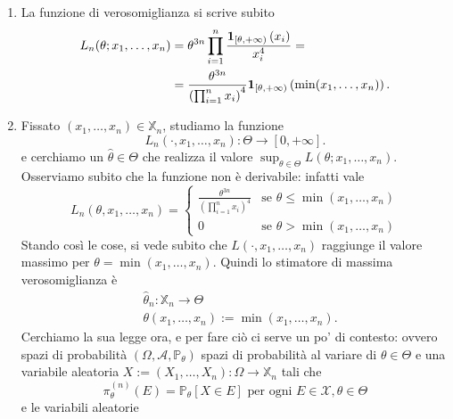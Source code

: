 \begin{soluzione}
  \begin{enumerate}
  \item La funzione di verosomiglianza si scrive subito
    \begin{align*}
      L_n (\theta; x_1, \dots{}, x_n) & = \theta^{3n} \prod_{i = 1}^n \frac{\mathbf 1_{[\theta, +\infty)}\left(x_i\right)}{x_i^4} = \\
                                 & = \frac{\theta^{3n}}{\left(\prod_{i = 1}^n x_i\right)^4} \mathbf 1_{[\theta, +\infty)}\left(\min(x_1, \dots{}, x_n)\right) .
    \end{align*}
    
  \item Fissato \((x_1, \dots{}, x_n) \in \mathbb{X}_n\), studiamo la
    funzione
    \[
      L_n(\cdot, x_1, \dots{}, x_n) : \Theta \to [0, +\infty] .
    \]
    e cerchiamo un \(\hat \theta \in \Theta\) che realizza il valore
    \(\sup_{\theta \in \Theta} L(\theta; x_1, \dots{}, x_n)\). Osserviamo subito che la
    funzione non è derivabile: infatti vale
    \[
      L_n(\theta, x_1, \dots{}, x_n) =
      \begin{cases}
        \frac{\theta^{3n}}{\left(\prod_{i = 1}^n x_i\right)^4} & \text{se } \theta \le
                                                        \min\left(
                                                        x_1, \dots{},
                                                        x_n \right) \\
        0 & \text{se } \theta > \min\left( x_1, \dots{}, x_n \right)
      \end{cases}
    \]
    Stando così le cose, si vede subito che
    \(L(\cdot, x_1, \dots{}, x_n)\) raggiunge il valore massimo per
    \(\theta = \min(x_1, \dots{}, x_n)\). Quindi lo stimatore di
    massima verosomiglianza è
    \begin{align*}
      & \hat \theta_n : \mathbb{X}_n \to \Theta \\
      & \theta(x_1, \dots{}, x_n) := \min(x_1, \dots{}, x_n) .
    \end{align*}
    Cerchiamo la sua legge ora, e per fare ciò ci serve un po' di
    contesto: ovvero spazi di probabilità
    \((\Omega, \mathcal{A}, \mathbb{P}_\theta)\) spazi di probabilità
    al variare di \(\theta \in \Theta\) e una variabile aleatoria
    \(X := (X_1, \dots{}, X_n) : \Omega \to \mathbb{X}_n\) tali che
    \[
      \pi_\theta^{(n)} (E) = \mathbb{P}_\theta [X \in E] \text{ per
        ogni } E \in \mathcal{X}, \theta \in \Theta
    \]
    e le variabili aleatorie

\end{enumerate}
\end{soluzione}
